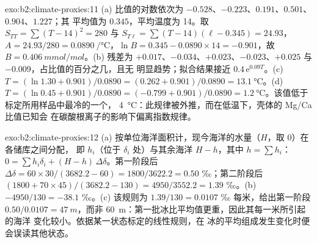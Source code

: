 \begin{solution}{exo:b2:climate-proxies:11}
(a) 比值的对数依次为 $-0.528$、$-0.223$、$0.191$、$0.501$、$0.904$、$1.227$；其
平均值为 $0.345$，平均温度为 14。取 $S_{TT} = \sum (T - 14)^2 = 280$ 与 $S_{T\ell} =
\sum (T - 14)(\ell - 0.345) = 24.93$，$A = 24.93/280 = \qty{0.0890}{\per\celsius}$，$\ln B =
0.345 - 0.0890 \times 14 = -0.901$，故 $B = \qty{0.406}{mmol/mol}$。(b) 残差为
$+0.017$、$-0.034$、$+0.023$、$-0.023$、$+0.025$ 与 $-0.009$，占比值的百分之几，且无
明显趋势；拟合结果接近 $0.4\,\mathrm{e}^{0.09T}$。(c) $T = (\ln 1.30 + 0.901)/0.0890 = (0.262 +
0.901)/0.0890 = \qty{13.1}{\celsius}$。(d) $T = (\ln 0.45 + 0.901)/0.0890 = (-0.799 +
0.901)/0.0890 = \qty{1.2}{\celsius}$。该值低于标定所用样品中最冷的一个，
\qty{4}{\celsius}：此规律被外推，而在低温下，壳体的 Mg/Ca 比值已知会
在碳酸根离子的影响下偏离指数规律。
\end{solution}

\begin{solution}{exo:b2:climate-proxies:12}
(a) 按单位海洋面积计，现今海洋的水量（$H$，取 0）在各储库之间分配，
即 $h_i$（位于 $\delta_i$ 处）与其余海洋 $H - h$，其中 $h = \sum h_i$：$0 = \sum h_i\delta_i +
(H - h)\,\Delta\delta$。第一阶段后 $\Delta\delta = 60 \times 30/(3682.2 - 60) =
1800/3622.2 = 0.50$ ‰；第二阶段后 $(1800 + 70 \times 45)/(3682.2 - 130) =
4950/3552.2 = 1.39$ ‰。(b) $-4950/130 = -38.1$ ‰。(c) 该规则为 $1.39/130 = 0.0107$
‰ 每米，给出第一阶段 $0.50/0.0107 = \qty{47}{m}$，而非
\qty{60}{m}：第一批冰比平均值更重，因此其每一米所引起的海洋
变化较小。依据某一状态标定的线性规则，在
冰的平均组成发生变化时便会误读其他状态。
\end{solution}

